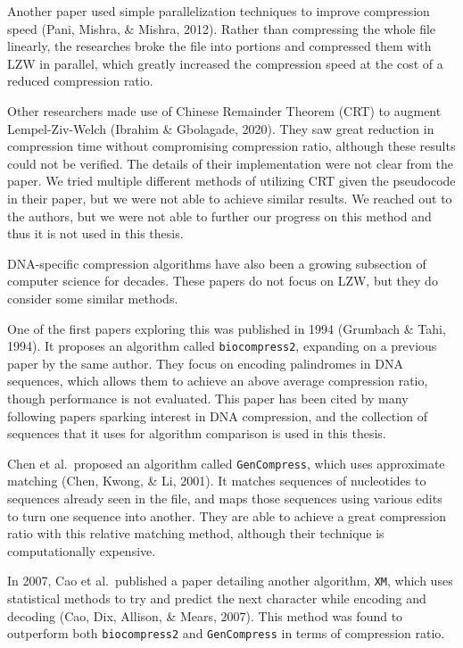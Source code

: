\documentclass[12pt,twoside]{reedthesis}
\begin{document}
Another paper used simple parallelization techniques to improve compression speed (Pani, Mishra, \& Mishra, 2012). Rather than compressing the whole file linearly, the researches broke the file into portions and compressed them with LZW in parallel, which greatly increased the compression speed at the cost of a reduced compression ratio.

Other researchers made use of Chinese Remainder Theorem (CRT) to augment Lempel-Ziv-Welch (Ibrahim \& Gbolagade, 2020). They saw great reduction in compression time without compromising compression ratio, although these results could not be verified. The details of their implementation were not clear from the paper. We tried multiple different methods of utilizing CRT given the pseudocode in their paper, but we were not able to achieve similar results. We reached out to the authors, but we were not able to further our progress on this method and thus it is not used in this thesis.

DNA-specific compression algorithms have also been a growing subsection of computer science for decades. These papers do not focus on LZW, but they do consider some similar methods.

One of the first papers exploring this was published in 1994 (Grumbach \& Tahi, 1994). It proposes an algorithm called \texttt{biocompress2}, expanding on a previous paper by the same author. They focus on encoding palindromes in DNA sequences, which allows them to achieve an above average compression ratio, though performance is not evaluated. This paper has been cited by many following papers sparking interest in DNA compression, and the collection of sequences that it uses for algorithm comparison is used in this thesis.

Chen et al.~proposed an algorithm called \texttt{GenCompress}, which uses approximate matching (Chen, Kwong, \& Li, 2001). It matches sequences of nucleotides to sequences already seen in the file, and maps those sequences using various edits to turn one sequence into another. They are able to achieve a great compression ratio with this relative matching method, although their technique is computationally expensive.

In 2007, Cao et al.~published a paper detailing another algorithm, \texttt{XM}, which uses statistical methods to try and predict the next character while encoding and decoding (Cao, Dix, Allison, \& Mears, 2007). This method was found to outperform both \texttt{biocompress2} and \texttt{GenCompress} in terms of compression ratio.
\end{document}
